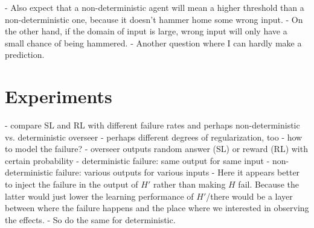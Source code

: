 \documentclass{farlamp}
\begin{document}
- Also expect that a non-deterministic agent will mean a higher threshold than a
non-deterministic one, because it doesn't hammer home some wrong input.
- On the other hand, if the domain of input is large, wrong input will only have
a small chance of being hammered.
- Another question where I can hardly make a prediction.


\section{Experiments}

- compare SL and RL with different failure rates and perhaps
non-deterministic vs. deterministic overseer
- perhaps different degrees of regularization, too
- how to model the failure?
    - overseer outputs random answer (SL) or reward (RL) with certain
    probability
    - deterministic failure: same output for same input
    - non-deterministic failure: various outputs for various inputs
    - Here it appears better to inject the failure in the output of $H'$ rather
    than making $H$ fail. Because the latter would just lower the learning
    performance of $H'$/there would be a layer between where the failure happens
    and the place where we interested in observing the effects.
    - So do the same for deterministic.

\printbibliography
\end{document}
